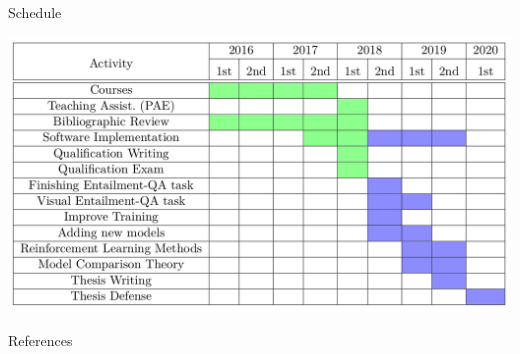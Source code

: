 \documentclass[10pt]{beamer}
\begin{document}
\begin{frame}{Schedule}
\begin{center}
\includegraphics[scale=0.24]{images/workplan.png}
\end{center}
\end{frame}



\begin{frame}[allowframebreaks]{References}

  
  

\end{frame}
\end{document}

